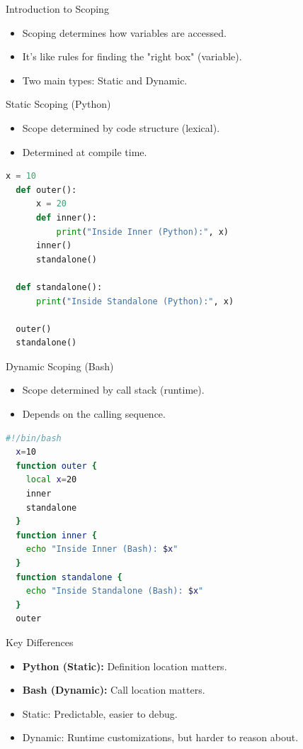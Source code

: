 \begin{frame}{Introduction to Scoping}
    \begin{itemize}
      \item Scoping determines how variables are accessed.
      \item It's like rules for finding the "right box" (variable).
      \item Two main types: Static and Dynamic.
    \end{itemize}
  \end{frame}
  
  \begin{frame}[fragile]{Static Scoping (Python)}
    \begin{itemize}
      \item Scope determined by code structure (lexical).
      \item Determined at compile time.
    \end{itemize}
    \begin{lstlisting}[language=Python]
  x = 10
  def outer():
      x = 20
      def inner():
          print("Inside Inner (Python):", x)
      inner()
      standalone()
  
  def standalone():
      print("Inside Standalone (Python):", x)
  
  outer()
  standalone()
    \end{lstlisting}
  \end{frame}


  \begin{frame}[fragile]{Dynamic Scoping (Bash)}
    \begin{itemize}
      \item Scope determined by call stack (runtime).
      \item Depends on the calling sequence.
    \end{itemize}
    \begin{lstlisting}[language=bash]
  #!/bin/bash
  x=10
  function outer {
    local x=20
    inner
    standalone
  }
  function inner {
    echo "Inside Inner (Bash): $x"
  }
  function standalone {
    echo "Inside Standalone (Bash): $x"
  }
  outer
    \end{lstlisting}
  \end{frame}

  \begin{frame}{Key Differences}
    \begin{itemize}
      \item \textbf{Python (Static):} Definition location matters.
      \item \textbf{Bash (Dynamic):} Call location matters.
      \item Static: Predictable, easier to debug.
      \item Dynamic: Runtime customizations, but harder to reason about.
    \end{itemize}
  \end{frame}
   
